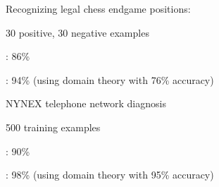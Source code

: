 \centerline{\hbox{}}


 \bk

\centerline{\hbox{}}

 \bk

Recognizing legal chess endgame positions:
\bi
\item 30 positive, 30 negative examples
\item {}: 86\%
\item {}: 94\% (using domain theory with 76\% accuracy)
\ei

NYNEX telephone network diagnosis
\bi
\item 500 training examples
\item {}: 90\%
\item {}: 98\% (using domain theory with 95\% accuracy)
\ei














